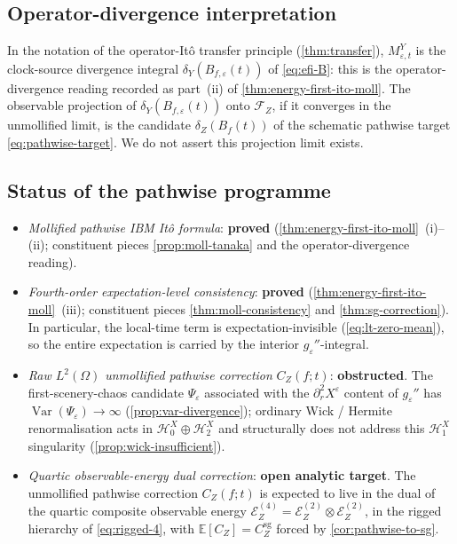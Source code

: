 \documentclass[11pt,reqno]{amsart}
\theoremstyle{plain}
\theoremstyle{definition}
\theoremstyle{remark}
\newcommand{\E}{\mathbb{E}}
\newcommand{\Hilb}{\mathcal{H}}
\newcommand{\Energy}{\mathcal{E}}
\newcommand{\IBM}{Z}
\DeclareMathOperator{\Var}{Var}
\begin{document}
\subsection*{Operator-divergence interpretation}

In the notation of the operator-It\^o transfer principle
(\cref{thm:transfer}), $M_{\varepsilon,t}^{Y}$ is the clock-source
divergence integral $\delta_Y(B_{f,\varepsilon}(t))$ of
\eqref{eq:efi-B}: this is the operator-divergence reading recorded
as part~(ii) of \cref{thm:energy-first-ito-moll}. The observable
projection of $\delta_Y(B_{f,\varepsilon}(t))$ onto $\mathcal F_\IBM$,
if it converges in the unmollified limit, is the candidate
$\delta_\IBM(B_f(t))$ of the schematic pathwise target
\eqref{eq:pathwise-target}. We do not assert this projection limit
exists.

\subsection*{Status of the pathwise programme}

\begin{itemize}
\item \emph{Mollified pathwise IBM It\^o formula}: \textbf{proved}
  (\cref{thm:energy-first-ito-moll}~(i)--(ii); constituent pieces
  \cref{prop:moll-tanaka} and the operator-divergence reading).
\item \emph{Fourth-order expectation-level consistency}: \textbf{proved}
  (\cref{thm:energy-first-ito-moll}~(iii); constituent pieces
  \cref{thm:moll-consistency} and \cref{thm:sg-correction}). In
  particular, the local-time term is expectation-invisible
  (\eqref{eq:lt-zero-mean}), so the entire expectation is carried by
  the interior $g_\varepsilon''$-integral.
\item \emph{Raw $L^{2}(\Omega)$ unmollified pathwise correction}
  $C_\IBM(f;t)$: \textbf{obstructed}. The first-scenery-chaos
  candidate $\Psi_\varepsilon$ associated with the
  $\partial_r^{2}X^\varepsilon$ content of $g_\varepsilon''$ has
  $\Var(\Psi_\varepsilon)\to\infty$
  (\cref{prop:var-divergence}); ordinary Wick / Hermite renormalisation
  acts in $\Hilb_0^{X}\oplus\Hilb_2^{X}$ and structurally does not
  address this $\Hilb_1^{X}$ singularity
  (\cref{prop:wick-insufficient}).
\item \emph{Quartic observable-energy dual correction}: \textbf{open
  analytic target}. The unmollified pathwise correction $C_\IBM(f;t)$
  is expected to live in the dual of the quartic composite observable
  energy $\Energy_\IBM^{(4)}=\Energy_\IBM^{(2)}\otimes
  \Energy_\IBM^{(2)}$, in the rigged hierarchy of
  \eqref{eq:rigged-4}, with $\E[C_\IBM]=C_\IBM^{\mathrm{sg}}$ forced
  by \cref{cor:pathwise-to-sg}.
\end{itemize}
\end{document}
